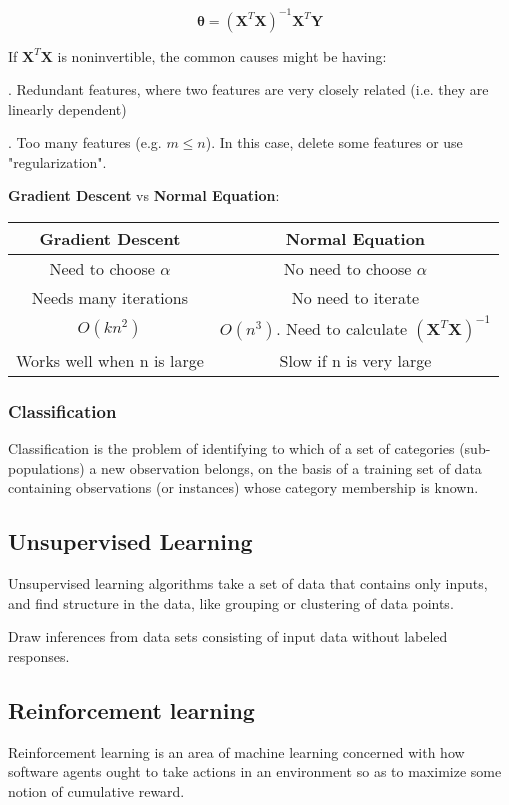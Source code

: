 \documentclass{article}
\begin{document}
\[
\boldsymbol{\theta} = (\textbf{X}^T\textbf{X})^{-1}\textbf{X}^T\textbf{Y}
\]

\noindent If \(\textbf{X}^T\textbf{X}\) is noninvertible, the common causes might be having:

. Redundant features, where two features are very closely related (i.e. they are linearly dependent)

. Too many features (e.g. \(m \leq n\)). In this case, delete some features or use "regularization".

\bigskip

\noindent \textbf{Gradient Descent} vs \textbf{Normal Equation}:

\begin{center}
\begin{tabular}{ | c | c | } 
\hline
\textbf{Gradient Descent} & \textbf{Normal Equation} \\ 
\hline
Need to choose \(\alpha\) & No need to choose \(\alpha\) \\ 
\hline
Needs many iterations & No need to iterate \\ 
\hline
\(O(kn^2)\) & \(O(n^3)\). Need to calculate \((\textbf{X}^T\textbf{X})^{-1}\) \\ 
\hline
Works well when n is large & Slow if n is very large \\ 
\hline
\end{tabular}
\end{center}

\subsubsection{Classification}

Classification is the problem of identifying to which 
of a set of categories (sub-populations) a new observation 
belongs, on the basis of a training set of data containing 
observations (or instances) whose category membership is known.

\subsection{Unsupervised Learning}

Unsupervised learning algorithms take a set of data that 
contains only inputs, and find structure in the data, like 
grouping or clustering of data points.

\bigskip

\noindent Draw inferences from data sets consisting of input 
data without labeled responses.

\subsection{Reinforcement learning}
       
Reinforcement learning is an area of machine learning concerned 
with how software agents ought to take actions in an environment 
so as to maximize some notion of cumulative reward.

\printindex
\end{document}
